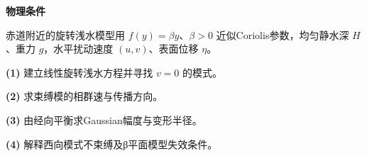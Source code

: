 \textbf{物理条件}\par 赤道附近的旋转浅水模型用 \(f(y)=\beta y\)、\(\beta>0\) 近似Coriolis参数，均匀静水深 \(H\)、重力 \(g\)，水平扰动速度 \((u,v)\)、表面位移 \(\eta\)。
\par\noindent\textbf{(1)} 建立线性旋转浅水方程并寻找 \(v=0\) 的模式。
\par\noindent\textbf{(2)} 求束缚模的相群速与传播方向。
\par\noindent\textbf{(3)} 由经向平衡求Gaussian幅度与变形半径。
\par\noindent\textbf{(4)} 解释西向模式不束缚及β平面模型失效条件。
